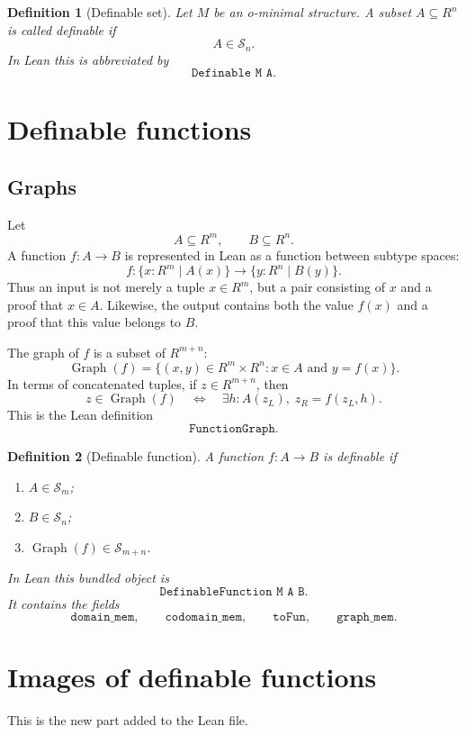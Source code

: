 \documentclass[11pt]{article}
\newtheorem{definition}{Definition}[section]
\newcommand{\Sfam}{\mathcal S}
\newcommand{\Graph}{\operatorname{Graph}}
\newcommand{\Lean}[1]{\texttt{#1}}
\begin{document}
\begin{definition}[Definable set]
Let $M$ be an o-minimal structure.  A subset $A\subseteq R^n$ is called definable if
\[
  A\in\Sfam_n.
\]
In Lean this is abbreviated by
\[
  \Lean{Definable M A}.
\]
\end{definition}

\section{Definable functions}

\subsection{Graphs}

Let
\[
  A\subseteq R^m,
  \qquad
  B\subseteq R^n.
\]
A function $f:A\to B$ is represented in Lean as a function between subtype spaces:
\[
  f:
  \{x:R^m\mid A(x)\}
  \longrightarrow
  \{y:R^n\mid B(y)\}.
\]
Thus an input is not merely a tuple $x\in R^m$, but a pair consisting of $x$ and a proof that
$x\in A$.  Likewise, the output contains both the value $f(x)$ and a proof that this value belongs to
$B$.

The graph of $f$ is a subset of $R^{m+n}$:
\[
  \Graph(f)=\{(x,y)\in R^m\times R^n:x\in A\text{ and }y=f(x)\}.
\]
In terms of concatenated tuples, if $z\in R^{m+n}$, then
\[
  z\in\Graph(f)
  \quad\Longleftrightarrow\quad
  \exists h:A(z_L),\; z_R=f(z_L,h).
\]
This is the Lean definition
\[
  \Lean{FunctionGraph}.
\]

\begin{definition}[Definable function]
A function $f:A\to B$ is definable if
\begin{enumerate}[label=(\roman*)]
  \item $A\in\Sfam_m$;
  \item $B\in\Sfam_n$;
  \item $\Graph(f)\in\Sfam_{m+n}$.
\end{enumerate}
In Lean this bundled object is
\[
  \Lean{DefinableFunction M A B}.
\]
It contains the fields
\[
  \Lean{domain\_mem},\qquad
  \Lean{codomain\_mem},\qquad
  \Lean{toFun},\qquad
  \Lean{graph\_mem}.
\]
\end{definition}

\section{Images of definable functions}

This is the new part added to the Lean file.
\end{document}
